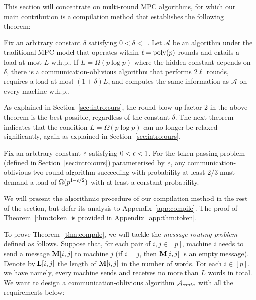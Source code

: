 \documentclass[sigconf]{acmart}
\def\extraspacing{\vspace{1mm} \noindent}
\def\A{\mathcal{A}}
\begin{document}
This section will concentrate on multi-round MPC algorithms, for which our main contribution is a compilation method that establishes the following theorem:

\begin{theorem} \label{thm:compile}
    Fix an arbitrary constant $\delta$ satisfying $0 < \delta < 1$. Let $\A$ be an algorithm under the traditional MPC model that operates within $\ell = \operatorname*{poly}(p)$ rounds and entails a load at most $L$ w.h.p.. If $L  = \Omega(p \log p)$ where the hidden constant depends on $\delta$, there is a communication-oblivious algorithm that performs $2\ell$ rounds, requires a load at most $(1 + \delta) L$, and computes the same information as $\A$ on every machine w.h.p..
\end{theorem}

As explained in Section~\ref{sec:intro:ours}, the round blow-up factor 2 in the above theorem is the best possible, regardless of the constant $\delta$. The next theorem indicates that the condition $L = \Omega(p \log p)$ can no longer be relaxed significantly, again as explained in Section~\ref{sec:intro:ours}.

\begin{theorem} \label{thm:token}
    Fix an arbitrary constant $\epsilon$ satisfying $0 < \epsilon < 1$. For the token-passing problem (defined in Section~\ref{sec:intro:ours}) parameterized by $\epsilon$, any communication-oblivious two-round algorithm succeeding with probability at least $2/3$ must demand a load of $\Omega(p^{1-\epsilon/2})$ with at least a constant probability.
\end{theorem}

We will present the algorithmic procedure of our compilation method in the rest of the section, but defer its analysis to Appendix~\ref{app:compile}. The proof of Theorem~\ref{thm:token} is provided in Appendix~\ref{app:thm:token}.

\extraspacing {\bf Message Routing.} To prove Theorem~\ref{thm:compile}, we will tackle the {\em message routing problem} defined as follows. Suppose that, for each pair of $i, j \in [p]$, machine $i$ needs to send a message $\mathbf{M}[i,j]$ to machine $j$ (if $i = j$, then $\mathbf{M}[i,j]$ is an empty message). Denote by $\mathbf{L}[i,j]$ the length of $\mathbf{M}[i,j]$ in the number of words. For each $i \in [p]$, we have
namely, every machine sends and receives no more than $L$ words in total. We want to design a communication-oblivious algorithm $\A_\mit{route}$ with all the requirements below:
\end{document}

